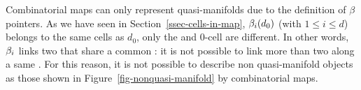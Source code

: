Combinatorial maps can only represent quasi-manifolds due to the
definition of $\beta$ pointers. As we have seen in
Section~\ref{ssec-cells-in-map}, $\beta_{i}(d_0)$ (with $1\leq i \leq d$)
belongs to the same cells as $d_0$, only the  and 0-cell are
different. In other words, $\beta_{i}$ links two  that
share a common : it is not possible to link more than two
 along a same .
%
%
For this reason, it is not possible to describe non quasi-manifold
objects as those shown in Figure~\ref{fig-nonquasi-manifold} by
combinatorial maps.
%
